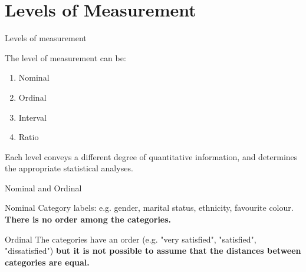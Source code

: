 \documentclass{beamer}
\begin{document}
\section{Levels of Measurement}
\begin{frame}{Levels of measurement}
  \begin{block}{The level of measurement can be:}
    \begin{enumerate}
      \item Nominal
      \item Ordinal
      \item Interval
      \item Ratio
    \end{enumerate}
 \end{block}
Each level conveys a different degree of quantitative information, and determines the appropriate statistical analyses.
\end{frame}

\begin{frame}{Nominal and Ordinal}
\begin{block}{Nominal}
    Category labels: e.g. gender, marital status, ethnicity, favourite colour. \textbf{There is no order among the categories.}
\end{block}
\pause
\begin{block}{Ordinal}
    The categories have an order (e.g. "very satisfied", "satisfied", "dissatisfied") \textbf{but it is not possible to assume that the distances between categories are equal.} \\
    \pause
    \centering
    \vspace{0.5em}
\end{block}
\end{frame}
\end{document}
